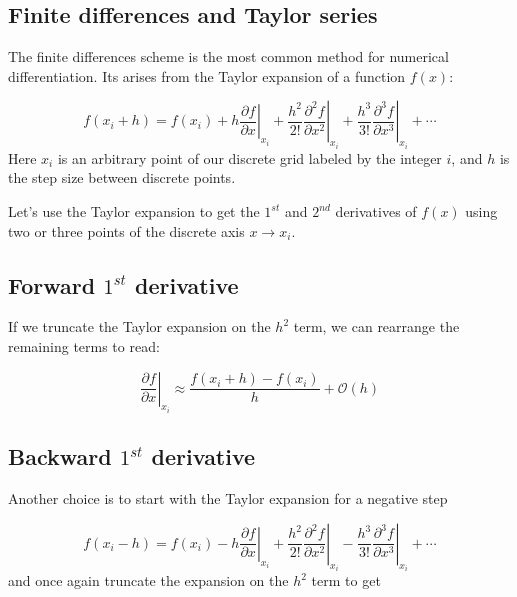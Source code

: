 \subsection{Finite differences and Taylor series}

The finite differences scheme is the most common method for numerical differentiation. Its arises from the Taylor expansion of a function $f(x)$:

\begin{equation}
 f(x_i+h) = f(x_i) + h \left.\dfrac{\partial f}{\partial x}\right|_{x_i} + \dfrac{h^2}{2!}\left.\dfrac{\partial^2 f}{\partial x^2}\right|_{x_i}
 +\dfrac{h^3}{3!}\left.\dfrac{\partial^3 f}{\partial x^3}\right|_{x_i} + \cdots
 \label{eq:fwdTaylor}
\end{equation}
Here $x_i$ is an arbitrary point of our discrete grid labeled by the integer $i$, and $h$ is the step size between discrete points.

Let's use the Taylor expansion to get the $1^{st}$ and $2^{nd}$ derivatives of $f(x)$ using two or three points of the discrete axis $x \rightarrow x_i$.

\subsection*{Forward $1^{st}$ derivative}

If we truncate the Taylor expansion on the $h^2$ term, we can rearrange the remaining terms to read:

\begin{equation}
 \left.\dfrac{\partial f}{\partial x}\right|_{x_i} \approx \dfrac{f(x_i+h) - f(x_i)}{h} + \mathcal{O}(h)
\end{equation}

\subsection*{Backward $1^{st}$ derivative}

Another choice is to start with the Taylor expansion for a negative step

\begin{equation}
 f(x_i-h) = f(x_i) - h \left.\dfrac{\partial f}{\partial x}\right|_{x_i} + \dfrac{h^2}{2!}\left.\dfrac{\partial^2 f}{\partial x^2}\right|_{x_i}
 -\dfrac{h^3}{3!}\left.\dfrac{\partial^3 f}{\partial x^3}\right|_{x_i} + \cdots
 \label{eq:bwdTaylor}
\end{equation}
and once again truncate the expansion on the $h^2$ term to get

